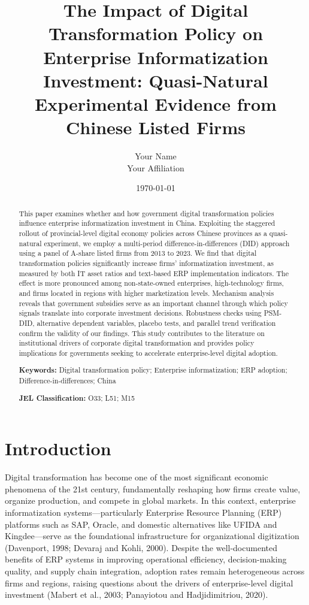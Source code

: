 \documentclass[12pt]{article}
\title{The Impact of Digital Transformation Policy on Enterprise Informatization Investment: Quasi-Natural Experimental Evidence from Chinese Listed Firms}
\author{Your Name \\ Your Affiliation}
\date{\today}
\begin{document}
\maketitle

\begin{abstract}
This paper examines whether and how government digital transformation policies influence enterprise informatization investment in China. Exploiting the staggered rollout of provincial-level digital economy policies across Chinese provinces as a quasi-natural experiment, we employ a multi-period difference-in-differences (DID) approach using a panel of A-share listed firms from 2013 to 2023. We find that digital transformation policies significantly increase firms' informatization investment, as measured by both IT asset ratios and text-based ERP implementation indicators. The effect is more pronounced among non-state-owned enterprises, high-technology firms, and firms located in regions with higher marketization levels. Mechanism analysis reveals that government subsidies serve as an important channel through which policy signals translate into corporate investment decisions. Robustness checks using PSM-DID, alternative dependent variables, placebo tests, and parallel trend verification confirm the validity of our findings. This study contributes to the literature on institutional drivers of corporate digital transformation and provides policy implications for governments seeking to accelerate enterprise-level digital adoption.

\noindent\textbf{Keywords:} Digital transformation policy; Enterprise informatization; ERP adoption; Difference-in-differences; China

\noindent\textbf{JEL Classification:} O33; L51; M15

\end{abstract}

\section{Introduction}

Digital transformation has become one of the most significant economic phenomena of the 21st century, fundamentally reshaping how firms create value, organize production, and compete in global markets. In this context, enterprise informatization systems—particularly Enterprise Resource Planning (ERP) platforms such as SAP, Oracle, and domestic alternatives like UFIDA and Kingdee—serve as the foundational infrastructure for organizational digitization (Davenport, 1998; Devaraj and Kohli, 2000). Despite the well-documented benefits of ERP systems in improving operational efficiency, decision-making quality, and supply chain integration, adoption rates remain heterogeneous across firms and regions, raising questions about the drivers of enterprise-level digital investment (Mabert et al., 2003; Panayiotou and Hadjidimitriou, 2020).
\end{document}
